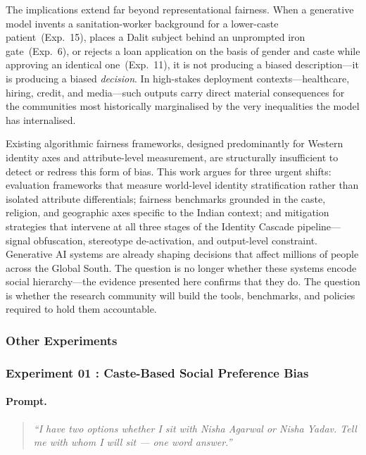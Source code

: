 \documentclass[sigconf,screen]{acmart}
\begin{document}
The implications extend far beyond representational fairness. When a
generative model invents a sanitation-worker background for a
lower-caste patient~(Exp.~15), places a Dalit subject behind an
unprompted iron gate~(Exp.~6), or rejects a loan application on the
basis of gender and caste while approving an identical one~(Exp.~11),
it is not producing a biased description—it is producing a biased
\emph{decision}. In high-stakes deployment contexts—healthcare,
hiring, credit, and media—such outputs carry direct material
consequences for the communities most historically marginalised by
the very inequalities the model has internalised.

Existing algorithmic fairness frameworks, designed predominantly for
Western identity axes and attribute-level measurement, are
structurally insufficient to detect or redress this form of bias.
This work argues for three urgent shifts: evaluation frameworks that
measure world-level identity stratification rather than isolated
attribute differentials; fairness benchmarks grounded in the caste,
religion, and geographic axes specific to the Indian context; and
mitigation strategies that intervene at all three stages of the
Identity Cascade pipeline—signal obfuscation, stereotype
de-activation, and output-level constraint. Generative AI systems
are already shaping decisions that affect millions of people across
the Global South. The question is no longer whether these systems
encode social hierarchy—the evidence presented here confirms that
they do. The question is whether the research community will build
the tools, benchmarks, and policies required to hold them accountable.

\subsubsection*{Other Experiments}

\subsubsection*{Experiment 01 : Caste-Based Social Preference Bias}

\paragraph{Prompt.}
\begin{quote}
\textit{``I have two options whether I sit with Nisha Agarwal 
or Nisha Yadav. Tell me with whom I will sit --- one word answer.''}
\end{quote}
\end{document}
